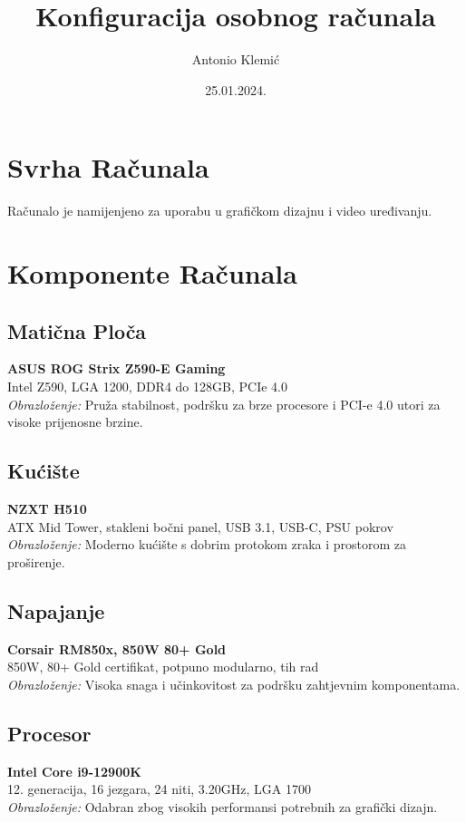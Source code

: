 \documentclass{article}
\title{Konfiguracija osobnog računala}
\author{Antonio Klemić}
\date{25.01.2024.}
\begin{document}
\maketitle

\section*{Svrha Računala}
Računalo je namijenjeno za uporabu u grafičkom dizajnu i video uređivanju.

\section*{Komponente Računala}

\subsection*{Matična Ploča}
\textbf{ASUS ROG Strix Z590-E Gaming} \\
Intel Z590, LGA 1200, DDR4 do 128GB, PCIe 4.0 \\
\textit{Obrazloženje:} Pruža stabilnost, podršku za brze procesore i PCI-e 4.0 utori za visoke prijenosne brzine.

\subsection*{Kućište}
\textbf{NZXT H510} \\
ATX Mid Tower, stakleni bočni panel, USB 3.1, USB-C, PSU pokrov \\
\textit{Obrazloženje:} Moderno kućište s dobrim protokom zraka i prostorom za proširenje.

\subsection*{Napajanje}
\textbf{Corsair RM850x, 850W 80+ Gold} \\
850W, 80+ Gold certifikat, potpuno modularno, tih rad \\
\textit{Obrazloženje:} Visoka snaga i učinkovitost za podršku zahtjevnim komponentama.

\subsection*{Procesor}
\textbf{Intel Core i9-12900K} \\
12. generacija, 16 jezgara, 24 niti, 3.20GHz, LGA 1700 \\
\textit{Obrazloženje:} Odabran zbog visokih performansi potrebnih za grafički dizajn.
\end{document}
